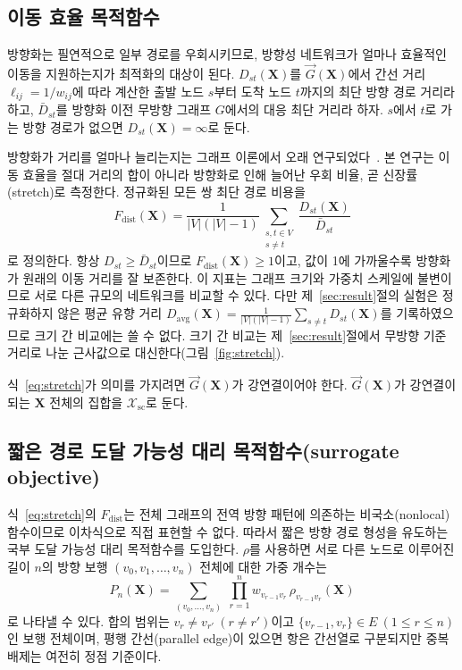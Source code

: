 \documentclass[twocolumn,a4paper]{article}
\begin{document}
\subsection{이동 효율 목적함수}

방향화는 필연적으로 일부 경로를 우회시키므로, 방향성 네트워크가 얼마나 효율적인 이동을 지원하는지가 최적화의 대상이 된다. \(D_{st}(\mathbf{X})\)를 \(\vec{G}(\mathbf{X})\)에서 간선 거리 \(\ell_{ij}=1/w_{ij}\)에 따라 계산한 출발 노드 \(s\)부터 도착 노드 \(t\)까지의 최단 방향 경로 거리라 하고, \(\bar{D}_{st}\)를 방향화 이전 무방향 그래프 \(G\)에서의 대응 최단 거리라 하자. \(s\)에서 \(t\)로 가는 방향 경로가 없으면 \(D_{st}(\mathbf{X})=\infty\)로 둔다.

방향화가 거리를 얼마나 늘리는지는 그래프 이론에서 오래 연구되었다~\cite{chvatal1978distances}. 본 연구는 이동 효율을 절대 거리의 합이 아니라 방향화로 인해 늘어난 우회 비율, 곧 신장률(stretch)로 측정한다. 정규화된 모든 쌍 최단 경로 비용을
\begin{equation}
F_{\mathrm{dist}}(\mathbf{X})=\frac{1}{|V|(|V|-1)}\sum_{\substack{s,t\in V\\s\neq t}}\frac{D_{st}(\mathbf{X})}{\bar{D}_{st}}
\label{eq:stretch}
\end{equation}
로 정의한다. 항상 \(D_{st}\geq\bar{D}_{st}\)이므로 \(F_{\mathrm{dist}}(\mathbf{X})\geq1\)이고, 값이 1에 가까울수록 방향화가 원래의 이동 거리를 잘 보존한다. 이 지표는 그래프 크기와 가중치 스케일에 불변이므로 서로 다른 규모의 네트워크를 비교할 수 있다. 다만 제~\ref{sec:result}절의 실험은 정규화하지 않은 평균 유향 거리 \(D_{\mathrm{avg}}(\mathbf{X})=\frac{1}{|V|(|V|-1)}\sum_{s\neq t}D_{st}(\mathbf{X})\)를 기록하였으므로 크기 간 비교에는 쓸 수 없다. 크기 간 비교는 제~\ref{sec:result}절에서 무방향 기준 거리로 나눈 근사값으로 대신한다(그림~\ref{fig:stretch}).

식~\eqref{eq:stretch}가 의미를 가지려면 \(\vec{G}(\mathbf{X})\)가 강연결이어야 한다. \(\vec{G}(\mathbf{X})\)가 강연결이 되는 \(\mathbf{X}\) 전체의 집합을 \(\mathcal{X}_{\mathrm{sc}}\)로 둔다.

\subsection{짧은 경로 도달 가능성 대리 목적함수(surrogate objective)} \label{subsec:model_hop}

식~\eqref{eq:stretch}의 \(F_{\mathrm{dist}}\)는 전체 그래프의 전역 방향 패턴에 의존하는 비국소(nonlocal) 함수이므로 이차식으로 직접 표현할 수 없다. 따라서 짧은 방향 경로 형성을 유도하는 국부 도달 가능성 대리 목적함수를 도입한다. \(\rho\)를 사용하면 서로 다른 노드로 이루어진 길이 \(n\)의 방향 보행 \((v_0,v_1,\dots,v_n)\) 전체에 대한 가중 개수는
\begin{equation}
P_n(\mathbf{X})=\sum_{(v_0,\dots,v_n)}\;\prod_{r=1}^{n}w_{v_{r-1}v_r}\,\rho_{v_{r-1}v_r}(\mathbf{X})
\label{eq:pn}
\end{equation}
로 나타낼 수 있다. 합의 범위는 \(v_r\neq v_{r'}\ (r\neq r')\)이고 \(\{v_{r-1},v_r\}\in E\ (1\leq r\leq n)\)인 보행 전체이며, 평행 간선(parallel edge)이 있으면 항은 간선열로 구분되지만 중복 배제는 여전히 정점 기준이다.
\end{document}
